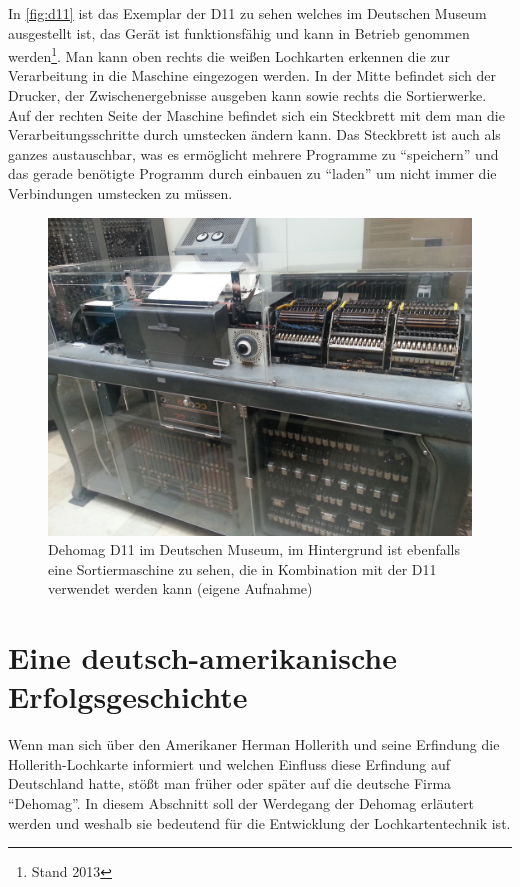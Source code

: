 \documentclass[parskip=half]{scrartcl}
\begin{document}
In \autoref{fig:d11} ist das Exemplar der D11 zu sehen welches im Deutschen
Museum ausgestellt ist, das Gerät ist funktionsfähig und kann in Betrieb
genommen werden\footnote{Stand 2013}. Man kann oben rechts die weißen
Lochkarten erkennen die zur Verarbeitung in die Maschine eingezogen werden. In
der Mitte befindet sich der Drucker, der Zwischenergebnisse ausgeben kann sowie
rechts die Sortierwerke. Auf der rechten Seite der Maschine befindet sich ein
Steckbrett mit dem man die Verarbeitungsschritte durch umstecken ändern kann.
Das Steckbrett ist auch als ganzes austauschbar, was es ermöglicht mehrere
Programme zu \enquote{speichern} und das gerade benötigte Programm durch
einbauen zu \enquote{laden} um nicht immer die Verbindungen umstecken zu
müssen.

\begin{figure}[h]
  \centering
  \includegraphics[width=\textwidth]{d11}
  \caption{Dehomag D11 im Deutschen Museum, im Hintergrund ist ebenfalls eine
    Sortiermaschine zu sehen, die in Kombination mit der D11 verwendet werden
    kann (eigene Aufnahme)}
  \label{fig:d11}
\end{figure}

\section{Eine deutsch-amerikanische Erfolgsgeschichte}

Wenn man sich über den Amerikaner Herman Hollerith und seine Erfindung die
Hollerith-Lochkarte informiert und welchen Einfluss diese Erfindung auf
Deutschland hatte, stößt man früher oder später auf die deutsche Firma
\enquote{Dehomag}. In diesem Abschnitt soll der Werdegang der Dehomag erläutert
werden und weshalb sie bedeutend  für die Entwicklung der Lochkartentechnik
ist.
\end{document}
